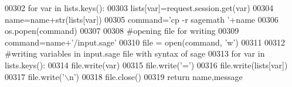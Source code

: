 \begin{DoxyCode}
00302     \textcolor{keywordflow}{for} var \textcolor{keywordflow}{in} lists.keys():
00303         lists[var]=request.session.get(var)
00304         name=name+str(lists[var])
00305     command=\textcolor{stringliteral}{'cp -r sagemath '}+name
00306     os.popen(command)
00307 
00308     \textcolor{comment}{#opening file for writing}
00309     command=name+\textcolor{stringliteral}{'/input.sage'}
00310     file = open(command, \textcolor{stringliteral}{'w'})
00311 
00312     \textcolor{comment}{#writing variables in input.sage file with syntax of sage}
00313     \textcolor{keywordflow}{for} var \textcolor{keywordflow}{in} lists.keys():
00314         file.write(var)
00315         file.write(\textcolor{stringliteral}{'='})
00316         file.write(lists[var])
00317         file.write(\textcolor{stringliteral}{'\(\backslash\)n'})
00318     file.close()
00319     \textcolor{keywordflow}{return} name,message
\end{DoxyCode}
